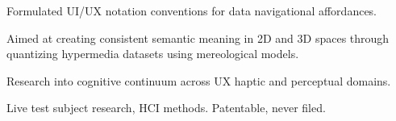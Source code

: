 \documentclass[letterpaper]{deedy-resume} %
\begin{document}
\begin{minipage}[t]{0.66\textwidth}
\sectionspace %



\begin{tightitemize}
\item Formulated UI/UX notation conventions for data navigational affordances.
\item Aimed at creating consistent semantic meaning in 2D and 3D spaces through quantizing hypermedia datasets using mereological models.
\item Research into cognitive continuum across UX haptic and perceptual domains.
\item Live test subject research, HCI methods.  Patentable, never filed.
\end{tightitemize}

\sectionspace %





\end{minipage} %

\end{document}
